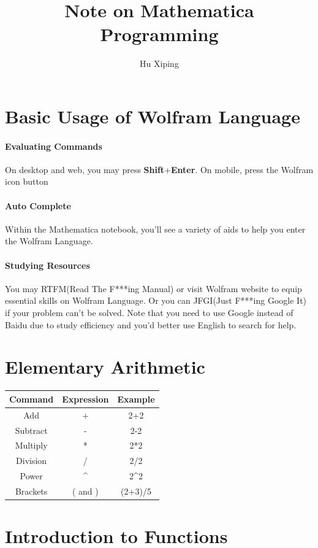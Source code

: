 \documentclass{article}
\begin{document}
	\author{Hu Xiping}
	\title{Note on Mathematica Programming}
	\maketitle
	\section{Basic Usage of Wolfram Language}
		\paragraph{Evaluating Commands}
			On desktop and web, you may press \textbf{Shift}+\textbf{Enter}. On mobile, press the Wolfram icon button
		\paragraph{Auto Complete}
			Within the Mathematica notebook, you'll see a variety of aids to help you enter the Wolfram Language.
		\paragraph{Studying Resources}
			You may RTFM(Read The F***ing Manual) or visit Wolfram website to equip essential skills on Wolfram Language. Or you can JFGI(Just F***ing Google It) if your problem can't be solved. Note that you need to use Google instead of Baidu due to study efficiency and you'd better use English to search for help.
			
		\section{Elementary Arithmetic}
			\begin{tabular}{|c|c|c|}
				\hline 
				Command & Expression & Example \\ 
				\hline 
				Add & + & 2+2 \\ 
				\hline
				Subtract & - & 2-2 \\ 
				\hline
				Multiply & * & 2*2 \\ 
				\hline
				Division & / & 2/2 \\ 
				\hline
				Power & \^{} & 2\^{}2 \\ 
				\hline
				Brackets & ( and ) & (2+3)/5 \\
				\hline
			\end{tabular} 
		\section{Introduction to Functions}
\end{document}
